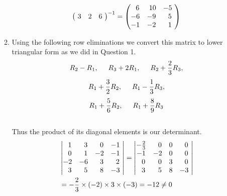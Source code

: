 \documentclass[12pt]{amsart}
\begin{document}
\begin{enumerate}
\begin{enumerate}
\begin{align}
\begin{pmatrix}
					\text{ }3 &2 &6 \text{ } 
				\end{pmatrix}^{-1}=
				\begin{pmatrix}
					\text{ } \text{ }6 &\text{ }10 &-5 \text{ } \\
					-6 &-9 &\text{ } \text{ }5 \text{ } \\
					-1 &-2 &\text{ } \text{ }1 \text{ }
				\end{pmatrix} \notag
			\end{align}
			\smallskip
			\item Using the following row eliminations we convert this matrix to lower triangular form as we 			did in Question 1.
			$$R_2-R_1, \hspace{0.5cm} R_3+2R_1, \hspace{0.5cm} R_2+\frac{2}{3}R_3,$$
			$$R_1+\frac{3}{2}R_2, \hspace{0.5cm} R_1-\frac{1}{3}R_3,$$
			$$R_1+\frac{5}{6}R_2,  \hspace{0.5cm} R_1+\frac{8}{9}R_3$$
				\\
			Thus the product of its diagonal elements is our determinant.
			\begin{align}
				&\begin{vmatrix}
					\text{ } \text{ }1 &\text{ } \text{ }3 &\text{ } \text{ }0 &-1 \text{ } \\
					\text{ } \text{ }0 &\text{ } \text{ }1 &-2 &-1 \text{ }  \\
					-2 &-6 &\text{ } \text{ }3 &\text{ } \text{ }2 \text{ } \\
					\text{ } \text{ }3 &\text{ } \text{ }5 &\text{ } \text{ }8 &-3 \text{ } 
				\end{vmatrix}=
				\begin{vmatrix}
					-\frac{2}{3} &\text{ } \text{ }0 &0 & \text{ } \text{ } 0 \text{ }\\
					-1 &-2 &0 &\text{ } \text{ }0 \text{ }  \\
					\text{ } \text{ }0 &\text{ } \text{ }0 &3 &\text{ } \text{ }0 \text{ } \\
					\text{ } \text{ }3 &\text{ } \text{ }5 &8 &-3 \text{ } 
				\end{vmatrix} \notag \\
				&=-\frac{2}{3}\times(-2)\times3\times(-3)=-12 \ne 0 \notag
			\end{align}
			

\end{enumerate}
\end{enumerate}
\end{document}
